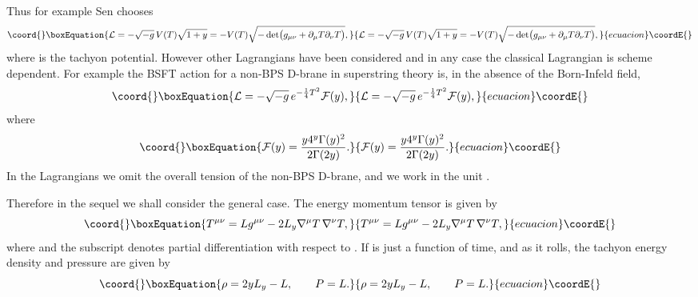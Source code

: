 \documentclass[a4paper,12pt]{article}
\begin{document}
Thus for example Sen chooses \cite{rolling}
\begin{equation}\coord{}\boxEquation{ 
{\cal L}= -\sqrt{-g} \thinspace
V(T) \sqrt{1+y} = -V(T) \sqrt{-\det \bigl(  g_{\mu \nu}
+\partial_\mu T
\partial_\nu T \bigr ) },  
\label{sencho}
}{ 
{\cal L}= -\sqrt{-g} \thinspace
V(T) \sqrt{1+y} = -V(T) \sqrt{-\det \bigl(  g_{\mu \nu}
+\partial_\mu T
\partial_\nu T \bigr ) },  
}{ecuacion}\coordE{}\end{equation} 
where \coordHE{} is the tachyon potential.
However other Lagrangians have been considered and in any case the
classical Lagrangian is scheme dependent. For example the BSFT
action for a non-BPS D-brane in superstring theory 
is, in the absence of the Born-Infeld field, \cite{kutasov}
\begin{equation}\coord{}\boxEquation{
{\cal L} = - \sqrt {-g} \thinspace  e^{ - \frac{1}{4} T^2 }
{\cal F}(y), 
}{
{\cal L} = - \sqrt {-g} \thinspace  e^{ - \frac{1}{4} T^2 }
{\cal F}(y), 
}{ecuacion}\coordE{}\end{equation} 
where 
\begin{equation}\coord{}\boxEquation{ 
{\cal F}(y) = \frac{y 4^y \Gamma (y) ^2}{2 \Gamma (2 y) }.
\label{bsftf}
}{ 
{\cal F}(y) = \frac{y 4^y \Gamma (y) ^2}{2 \Gamma (2 y) }.
}{ecuacion}\coordE{}\end{equation}
In the Lagrangians we 
omit the overall tension \coordHE{} of the non-BPS D\coordHE{}-brane,
and we work in the unit \coordHE{}. 


Therefore in the sequel we shall consider the general case. The
energy momentum tensor is given by 
\begin{equation}\coord{}\boxEquation{ 
T^{\mu \nu} = L g^{\mu \nu} -2 L_y \nabla ^\mu T 
\thinspace \nabla ^\nu T, 
}{ 
T^{\mu \nu} = L g^{\mu \nu} -2 L_y \nabla ^\mu T 
\thinspace \nabla ^\nu T, 
}{ecuacion}\coordE{}\end{equation} 
where 
\coordHE{} and the subscript \coordHE{}
denotes partial differentiation with respect to \coordHE{}. If  \coordHE{} is
just a function of time, \coordHE{} and as it rolls, the
tachyon energy density \myHighlight{$\rho$}\coordHE{} and pressure \coordHE{} are given by 
\begin{equation}\coord{}\boxEquation{
\rho = 2yL_y -L, \qquad P= L. 
}{
\rho = 2yL_y -L, \qquad P= L. 
}{ecuacion}\coordE{}\end{equation}
\end{document}
